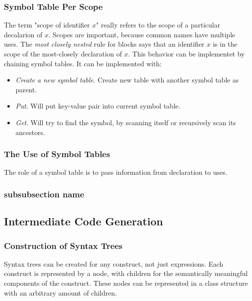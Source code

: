 \documentclass{article}
\begin{document}
\subsubsection{Symbol Table Per Scope} %
\label{ssub:Symbol Table Per Scope}
The term "scope of identifier $x$" really refers to the scope of a particular decalarion of $x$. Scopes are important, because common names have multiple uses. The \emph{most closely nested} rule for blocks says that an identifier $x$ is in the scope of the most-closely declaration of $x$. This behavior can be implementet by chaining symbol tables. It can be implemented with:
\begin{itemize}
	\item \emph{Create a new symbol table}. Create new table with another symbol table as parent.
	\item \emph{Put}. Will put key-value pair into current symbol table.
	\item \emph{Get}. Will try to find the symbol, by scanning itself or recursively scan its ancestors.
\end{itemize}

\subsubsection{The Use of Symbol Tables} %
\label{ssub:The Use of Symbol Tables}
The role of a symbol table is to pass information from declaration to uses.

\subsubsection{subsubsection name} %
\label{ssub:subsubsection name}



\subsection{Intermediate Code Generation} %
\label{sub:Intermediate Code Generation}

\subsubsection{Construction of Syntax Trees} %
\label{ssub:Construction of Syntax Trees}
Syntax trees can be created for any construct, not just expressions. Each construct is represented by a node, with children for the semantically meaningful components of the construct. These nodes can be represented in a class structure with an arbitrary amount of children.
\end{document}
